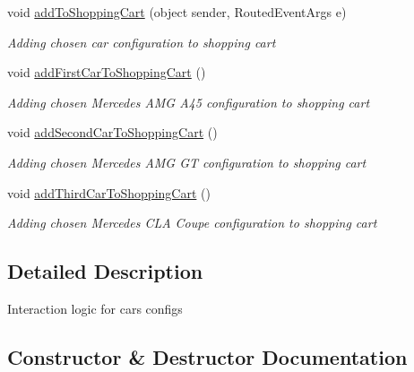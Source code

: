 \begin{DoxyCompactItemize}
void \mbox{\hyperlink{class_project_app_1_1_cars_configs_a3f5a51e193603365f8b449d1681445aa}{add\+To\+Shopping\+Cart}} (object sender, Routed\+Event\+Args e)
\begin{DoxyCompactList}\small\item\em Adding chosen car configuration to shopping cart \end{DoxyCompactList}\item 
void \mbox{\hyperlink{class_project_app_1_1_cars_configs_a583c7660c16bf8725967aa586b338986}{add\+First\+Car\+To\+Shopping\+Cart}} ()
\begin{DoxyCompactList}\small\item\em Adding chosen Mercedes A\+MG A45 configuration to shopping cart \end{DoxyCompactList}\item 
void \mbox{\hyperlink{class_project_app_1_1_cars_configs_a8426960d8c1a7ce87c6a5e69065dac89}{add\+Second\+Car\+To\+Shopping\+Cart}} ()
\begin{DoxyCompactList}\small\item\em Adding chosen Mercedes A\+MG GT configuration to shopping cart \end{DoxyCompactList}\item 
void \mbox{\hyperlink{class_project_app_1_1_cars_configs_a7adb47c84724e950b614c1d74129af9f}{add\+Third\+Car\+To\+Shopping\+Cart}} ()
\begin{DoxyCompactList}\small\item\em Adding chosen Mercedes C\+LA Coupe configuration to shopping cart \end{DoxyCompactList}\end{DoxyCompactItemize}


\subsection{Detailed Description}
Interaction logic for cars configs 



\subsection{Constructor \& Destructor Documentation}
\mbox{\label{class_project_app_1_1_cars_configs_a8dacfe24f32ecb80820ecbbef629012f}} 
